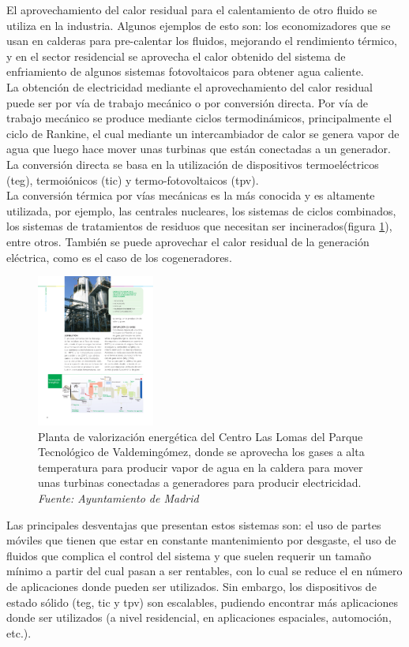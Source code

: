 El aprovechamiento del calor residual para el calentamiento de otro fluido se utiliza en la industria. Algunos ejemplos de esto son: los economizadores que se usan en calderas para pre-calentar los fluidos, mejorando el rendimiento térmico, y en el sector residencial se aprovecha el calor obtenido del sistema de enfriamiento de algunos sistemas fotovoltaicos para obtener agua caliente.\\ 

La obtención de electricidad mediante el aprovechamiento del calor residual puede ser por vía de trabajo mecánico o por conversión directa. Por vía de trabajo mecánico se produce mediante ciclos termodinámicos, principalmente el ciclo de Rankine, el cual mediante un intercambiador de calor se genera vapor de agua que luego hace mover unas turbinas que están conectadas a un generador. La conversión directa se basa en la utilización de dispositivos termoeléctricos (\acrshort{teg}), termoiónicos (\acrshort{tic}) y termo-fotovoltaicos (\acrshort{tpv}).\\

La conversión térmica por vías mecánicas es la más conocida y es altamente utilizada, por ejemplo, las centrales nucleares, los sistemas de ciclos combinados, los sistemas de tratamientos de residuos que necesitan ser incinerados(figura \ref{fig:esquemaslomasvalorizacion}), entre otros. También se puede aprovechar el calor residual de la generación eléctrica, como es el caso de los cogeneradores.

\begin{figure}[H]
	\centering
	\includegraphics[height=5cm]{figuras/esquemasLomasValorizacion}
	\caption{Planta de valorización energética del Centro Las Lomas del Parque Tecnológico de Valdemingómez, donde se aprovecha los gases a alta temperatura para producir vapor de agua en la caldera para mover unas turbinas conectadas a generadores para producir electricidad. \textit{Fuente: Ayuntamiento de Madrid}}
	\label{fig:esquemaslomasvalorizacion}
\end{figure}
Las principales desventajas que presentan estos sistemas son: el uso de partes móviles que tienen que estar en constante mantenimiento por desgaste, el uso de fluidos que complica el control del sistema y que suelen requerir un tamaño mínimo a partir del cual pasan a ser rentables, con lo cual se reduce el en número de aplicaciones donde pueden ser utilizados. Sin embargo, los dispositivos de estado sólido (\acrshort{teg}, \acrshort{tic} y \acrshort{tpv}) son escalables, pudiendo encontrar más aplicaciones donde ser utilizados (a nivel residencial, en aplicaciones espaciales, automoción, etc.).\\

